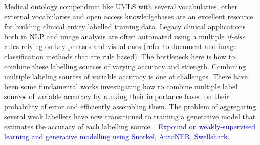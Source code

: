 \documentclass[10.7pt,]{article}
\begin{document}
Medical ontology compendium like UMLS with several vocabularies, other external vocabularies and open access knowledgebases are an excellent resource for building clinical entity labelled training data. 
Legacy clinical applications both in NLP and image analysis are often automated using a multiple \textit{if-else} rules relying on key-phrases and visual cues (refer to document and image classification methods that are rule based).
The bottleneck here is how to combine these labelling sources of varying accuracy and strength.
Combining multiple labeling sources of variable accuracy is one of challenges.
There have been some fundamental works investigating how to combine multiple label sources of variable accuracy by ranking their importance based on their probability of error and efficiently assembling them.
The problem of aggregating several weak labellers have now transitioned to training a generative model that estimates the accuracy of each labelling source~\cite{ratner2016data,safranchik2020weakly,lison2021skweak}.
\textcolor{blue}{Expound on weakly-supervised learning and generative modelling using Snorkel, AutoNER, Swellshark.}
\end{document}
